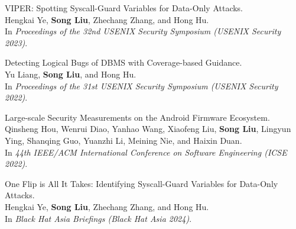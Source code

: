 \shorterSection{\textcolor{titleblue}{Conference Proceedings}}
\begin{enumerate}[label={[\arabic*]}]


	\item VIPER: Spotting Syscall-Guard Variables for Data-Only Attacks. \\
	      Hengkai Ye, \textbf{Song Liu}, Zhechang Zhang, and Hong Hu. \\
	      In \textit{Proceedings of the 32nd USENIX Security Symposium (USENIX Security 2023)}.


	\item Detecting Logical Bugs of DBMS with Coverage-based Guidance. \\
	      Yu Liang, \textbf{Song Liu}, and Hong Hu. \\
	      In \textit{Proceedings of the 31st USENIX Security Symposium (USENIX Security 2022)}.

	\item Large-scale Security Measurements on the Android Firmware Ecosystem. \\
	      Qinsheng Hou, Wenrui Diao, Yanhao Wang, Xiaofeng Liu, \textbf{Song Liu}, Lingyun Ying, Shanqing Guo, Yuanzhi Li, Meining Nie, and Haixin Duan. \\
	      In \textit{44th IEEE/ACM International Conference on Software Engineering (ICSE 2022)}.

\end{enumerate}

\shorterSection{\textcolor{titleblue}{Industrial Conference}}
\begin{enumerate}[label={[\arabic*]}]
	\item One Flip is All It Takes: Identifying Syscall-Guard Variables for Data-Only Attacks. \\
	      Hengkai Ye, \textbf{Song Liu}, Zhechang Zhang, and Hong Hu. \\
	      In \textit{Black Hat Asia Briefings (Black Hat Asia 2024)}.
\end{enumerate}
